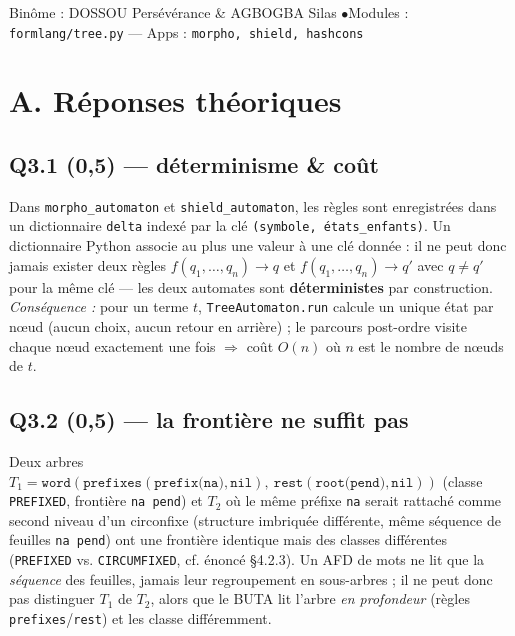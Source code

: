 \documentclass[11pt,a4paper]{scrartcl}
\begin{document}
{Binôme : DOSSOU Persévérance \& AGBOGBA Silas \quad$\bullet$\quad Modules : \texttt{formlang/tree.py} — Apps : \texttt{morpho, shield, hashcons}}

\section*{A. Réponses théoriques}

\subsection*{Q3.1 (0,5) — déterminisme \& coût}
Dans \texttt{morpho\_automaton} et \texttt{shield\_automaton}, les règles sont
enregistrées dans un dictionnaire \texttt{delta} indexé par la clé
\texttt{(symbole, états\_enfants)}. Un dictionnaire Python associe au plus une
valeur à une clé donnée : il ne peut donc jamais exister deux règles
$f(q_1,\dots,q_n)\to q$ et $f(q_1,\dots,q_n)\to q'$ avec $q\neq q'$ pour la même
clé — les deux automates sont \textbf{déterministes} par construction.
\emph{Conséquence :} pour un terme $t$, \texttt{TreeAutomaton.run} calcule un
unique état par nœud (aucun choix, aucun retour en arrière) ; le parcours
post-ordre visite chaque nœud exactement une fois $\Rightarrow$ coût
$O(n)$ où $n$ est le nombre de nœuds de $t$.

\subsection*{Q3.2 (0,5) — la frontière ne suffit pas}
Deux arbres $T_1=\texttt{word}(\texttt{prefixes}(\texttt{prefix(na)},
\texttt{nil}),\ \texttt{rest}(\texttt{root(pend)},\texttt{nil}))$ (classe
\texttt{PREFIXED}, frontière \texttt{na pend}) et $T_2$ où le même préfixe
\texttt{na} serait rattaché comme second niveau d'un circonfixe (structure
imbriquée différente, même séquence de feuilles \texttt{na pend}) ont une
frontière identique mais des classes différentes (\texttt{PREFIXED} vs.
\texttt{CIRCUMFIXED}, cf. énoncé §4.2.3). Un AFD de mots ne lit que la
\emph{séquence} des feuilles, jamais leur regroupement en sous-arbres ; il ne
peut donc pas distinguer $T_1$ de $T_2$, alors que le BUTA lit l'arbre
\emph{en profondeur} (règles \texttt{prefixes}/\texttt{rest}) et les classe
différemment.
\end{document}
